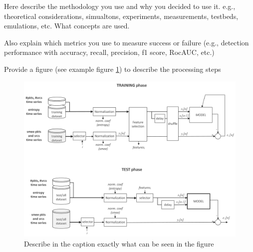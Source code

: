 Here describe the methodology you use and why you decided to use it.
e.g., theoretical considerations, simualtons, experiments, measurements, testbeds, emulations, etc. What concepts are used.

Also explain which metrics you use to measure success or failure (e.g., detection performance with accuracy, recall, precision, f1 score, RocAUC, etc.)


Provide a figure (see example figure \ref{fig:modeling-example}) to describe the processing steps

\begin{figure}[h]
	\centering
	\includegraphics[width=0.95\linewidth]{graphics/modeling-example}
	\caption{Describe in the caption exactly what can be seen in the figure}
	\label{fig:modeling-example}
\end{figure}




\newpage